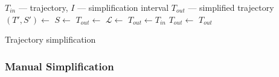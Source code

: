 \begin{algorithm}
  \begin{algorithmic}[1]
	  \Require $T_{in}$ --- trajectory, $I$ --- simplification interval
	  \Ensure $T_{out}$ --- simplified trajectory
			\State $(T', S') \gets$  
			\State $S \gets$ 
			\State
				\State $T_{out} \gets$ 
			\Else %
			  \State $\mathcal{L} \gets$  
				\State $T_{out} \gets T_{in}$
				 
					  \State $T_{out} \gets$ 
					\EndFor
				\EndFor
			\EndIf
			\State
			\State {}
			\State \Return $T_{out}$
		\EndProcedure
  \end{algorithmic}
	\caption{Trajectory simplification}
  \label{alg:simplify}
\end{algorithm}

\subsubsection*{Manual Simplification}

